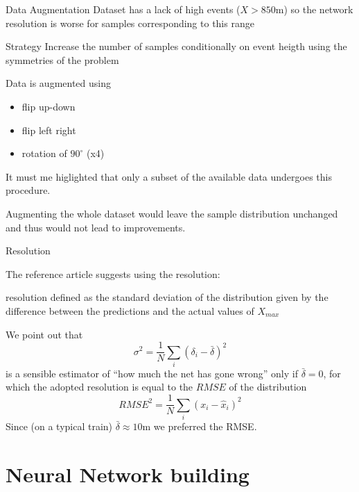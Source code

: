 \documentclass{beamer}
\begin{document}
\begin{frame}{Data Augmentation}
    Dataset has a lack of high events ($X > 850$m) so the network resolution is worse
    for samples corresponding to this range

    \begin{block}{Strategy}
        Increase the number of samples conditionally on event heigth using the
        symmetries of the problem
    \end{block}

    Data is augmented using
    \begin{itemize}
        \item flip up-down
        \item flip left right
        \item rotation of $90^{\circ}$ (x4)
    \end{itemize}
    
    It must me higlighted that only a subset of the available data undergoes this procedure.

    Augmenting the whole dataset would leave the sample distribution unchanged and thus would not lead 
    to improvements.
\end{frame}

\begin{frame}{Resolution}

    The reference article suggests using the resolution:
    \begin{block}{resolution}
        defined as the standard deviation of the distribution given by the difference between the predictions and the actual values of $X_{max}$
    \end{block}

    We point out that 
    \[\sigma^2 = \frac{1}{N}\sum_i (\delta_i - \bar{\delta})^2\]
    is a sensible estimator of ``how much the net has gone wrong'' only if $\bar{\delta} = 0$, for which the adopted resolution is equal 
    to the $RMSE$ of the distribution
    \[ RMSE^2 = \frac{1}{N}\sum_i(x_i - \hat{x}_i)^2 \]
    Since (on a typical train) $\bar{\delta} \approx 10$m we preferred the RMSE.
\end{frame}



\section{Neural Network building}
\end{document}
